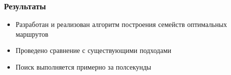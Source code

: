 \documentclass[mathserif]{beamer}
\begin{document}
\begin{frame}
    \frametitle{Результаты}
    \begin{itemize}
        \item<1-1> Разработан и реализован алгоритм построения семейств оптимальных маршрутов 
        \item<1-1> Проведено сравнение с существующими подходами 
        \item<1-1> Поиск выполняется примерно за полсекунды 
    \end{itemize}
\end{frame}
\end{document}
